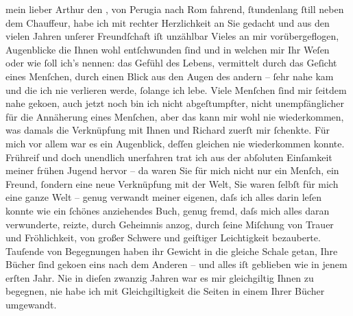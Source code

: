 \pstart{}mein lieber Arthur\pend\vspace{0.5em}
\pstart
           den \label{K_L02074-1v}\label{K_L02074-1}, von Perugia nach Rom fahrend,{ }ſtundenlang{ }ſtill neben dem Chauffeur, habe ich mit rechter Herzlichkeit an Sie gedacht
               und aus den vielen Jahren unſerer Freundſchaft iſt unzählbar Vieles an mir
               vorübergeflogen, Augenblicke die Ihnen wohl entſchwunden{ }ſind und in welchen mir Ihr
               Weſen oder wie{ }ſoll ich’s nennen: das Gefühl des Lebens, vermittelt durch das Geſicht
               eines Menſchen, durch einen Blick aus den Augen des andern –{ }ſehr nahe kam und die
               ich nie verlieren werde,{ }ſolange ich lebe. Viele Menſchen{ }ſind mir{ }ſeitdem nahe
                  geko{\geminationm}en, auch jetzt noch bin ich nicht abgeſtumpfter,
               nicht unempfänglicher für die Annäherung eines Menſchen, aber das kann mir wohl nie
               wiederkommen, was damals die Verknüpfung mit Ihnen und Richard zuerſt mir{ }ſchenkte. Für mich \introOben{}vor
                     allem\introOben{} war es ein Augenblick, deſſen {\pb}gleichen
               nie wiederkommen konnte. Frühreif und doch unendlich unerfahren trat ich aus der
               abſoluten Einſamkeit meiner frühen Jugend hervor – da waren Sie für mich nicht nur
               ein Menſch, ein Freund,{ }ſondern eine neue Verknüpfung mit der Welt, Sie waren{ }ſelbſt
               für mich eine ganze Welt –  genug verwandt meiner
               eigenen, daſs ich alles darin leſen konnte wie ein{ }ſchönes anziehendes Buch, genug
               fremd, daſs mich alles daran verwunderte, reizte, durch Geheimnis anzog, durch{ }ſeine
               Miſchung von Trauer und Fröhlichkeit, von großer Schwere und geiſtiger Leichtigkeit
               bezauberte. Tauſende von Begegnungen haben ihr Gewicht in die gleiche Schale getan,
               Ihre Bücher{ }ſind geko{\geminationm}en eins nach dem Anderen – und
               alles iſt geblieben wie in jenem erſten Jahr. Nie in dieſen zwanzig Jahren war es mir
               gleichgiltig Ihnen zu begegnen, nie habe ich mit Gleichgiltigkeit die Seiten in einem
               Ihrer Bücher umgewandt.\pend
           

